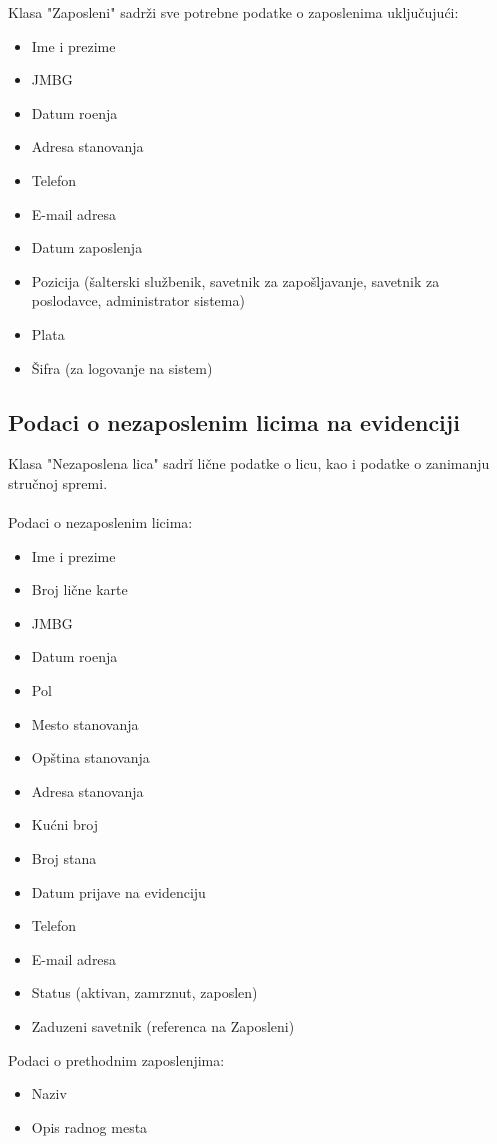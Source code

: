 Klasa "Zaposleni" sadr\v zi sve potrebne podatke o zaposlenima uklju\v cuju\' ci:
\begin{itemize}
	\item Ime i prezime
	\item JMBG
	\item Datum ro\dj enja
	\item Adresa stanovanja
	\item Telefon
	\item E-mail adresa
	\item Datum zaposlenja
	\item Pozicija (\v salterski slu\v zbenik, savetnik za zapo\v sljavanje, savetnik za poslodavce, administrator sistema)
	\item Plata
	\item \v Sifra (za logovanje na sistem)
\end{itemize}

\subsection{Podaci o nezaposlenim licima na evidenciji}

Klasa "Nezaposlena lica" sadr\v i li\v cne podatke o licu, kao i podatke o zanimanju stru\v cnoj spremi.
\\
\\ Podaci o nezaposlenim licima:
\begin{itemize}
	\item Ime i prezime
	\item Broj li\v cne karte
	\item JMBG
	\item Datum ro\dj enja
	\item Pol
	\item Mesto stanovanja
	\item Op\v stina stanovanja
	\item Adresa stanovanja
	\item Ku\' cni broj
	\item Broj stana 
	\item Datum prijave na evidenciju
	\item Telefon
	\item E-mail adresa
	\item Status (aktivan, zamrznut, zaposlen)
	\item Zaduzeni savetnik (referenca na Zaposleni)
\end{itemize}

\noindent Podaci o prethodnim zaposlenjima:
\begin{itemize}
	\item Naziv
	\item Opis radnog mesta
\end{itemize}

